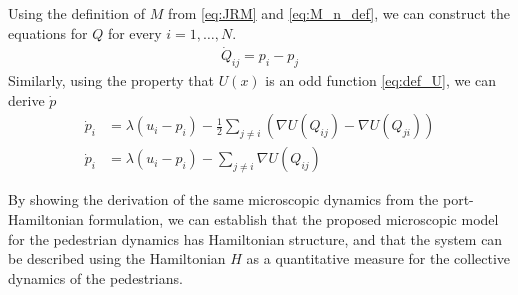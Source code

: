 Using the definition of $M$ from \autoref{eq:JRM} and \autoref{eq:M_n_def}, we can construct the equations for $Q$ for every $i = 1,\dots,N$.
\begin{align*}
    \dot Q_{ij} = p_i - p_j
\end{align*}
Similarly, using the property that $U(x)$ is an odd function \autoref{eq:def_U}, we can derive $\dot p$
\begin{align*}
    \dot p_i &= \lambda(u_i - p_i) - \frac{1}{2}\sum_{j \neq i}(\nabla U(Q_{ij}) - \nabla U(Q_{ji})) \\ 
    \dot p_i &= \lambda(u_i - p_i) - \sum_{j \neq i}\nabla U(Q_{ij}) 
\end{align*}

By showing the derivation of the same microscopic dynamics from the port-Hamiltonian formulation, we can establish that the proposed microscopic model for the pedestrian dynamics has Hamiltonian structure, and that the system can be described using the Hamiltonian $H$ as a quantitative measure for the collective dynamics of the pedestrians.

